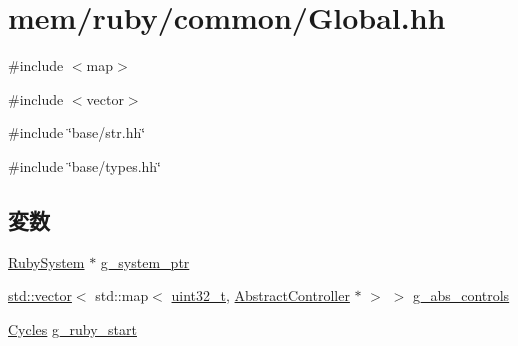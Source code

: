 \hypertarget{Global_8hh}{
\section{mem/ruby/common/Global.hh}
\label{Global_8hh}
}
{\ttfamily \#include $<$map$>$}\par
{\ttfamily \#include $<$vector$>$}\par
{\ttfamily \#include \char`\"{}base/str.hh\char`\"{}}\par
{\ttfamily \#include \char`\"{}base/types.hh\char`\"{}}\par
\subsection*{変数}
\begin{DoxyCompactItemize}
\item 
\hyperlink{classRubySystem}{RubySystem} $\ast$ \hyperlink{Global_8hh_ac7631ed7c7cc138c40a9e88e38d0ecb1}{g\_\-system\_\-ptr}
\item 
\hyperlink{classstd_1_1vector}{std::vector}$<$ std::map$<$ \hyperlink{Type_8hh_a435d1572bf3f880d55459d9805097f62}{uint32\_\-t}, \hyperlink{classAbstractController}{AbstractController} $\ast$ $>$ $>$ \hyperlink{Global_8hh_a69048389e2ba94f365456cd57622cba4}{g\_\-abs\_\-controls}
\item 
\hyperlink{classCycles}{Cycles} \hyperlink{Global_8hh_aa69be22cc9024a302f0883584fe87eea}{g\_\-ruby\_\-start}
\end{DoxyCompactItemize}


